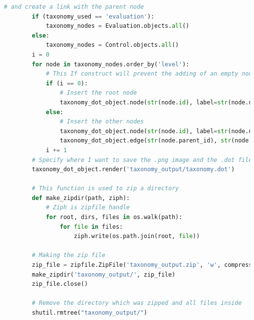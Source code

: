 \begin{itemize}
\begin{lstlisting}[language=Python, label=lst:view_DOT_eval, caption={Codice utilizzato per la realizzazione del
        file .dot e relativa immagine .png.}]
        # and create a link with the parent node
        if (taxonomy_used == 'evaluation'):
            taxonomy_nodes = Evaluation.objects.all()
        else:
            taxonomy_nodes = Control.objects.all()
        i = 0
        for node in taxonomy_nodes.order_by('level'):
            # This If construct will prevent the adding of an empty node to the root node in the graph
            if (i == 0):
                # Insert the root node
                taxonomy_dot_object.node(str(node.id), label=str(node.name))
            else:
                # Insert the other nodes
                taxonomy_dot_object.node(str(node.id), label=str(node.name))
                taxonomy_dot_object.edge(str(node.parent_id), str(node.id))
            i += 1
        # Specify where I want to save the .png image and the .dot file
        taxonomy_dot_object.render('taxonomy_output/taxonomy.dot')
 
        # This function is used to zip a directory
        def make_zipdir(path, ziph):
            # Ziph is zipfile handle
            for root, dirs, files in os.walk(path):
                for file in files:
                    ziph.write(os.path.join(root, file))
 
        # Making the zip file
        zip_file = zipfile.ZipFile('taxonomy_output.zip', 'w', compression=zipfile.ZIP_DEFLATED)
        make_zipdir('taxonomy_output/', zip_file)
        zip_file.close()
 
        # Remove the directory which was zipped and all files inside
        shutil.rmtree("taxonomy_output/")
 

\end{lstlisting}
\end{itemize}
